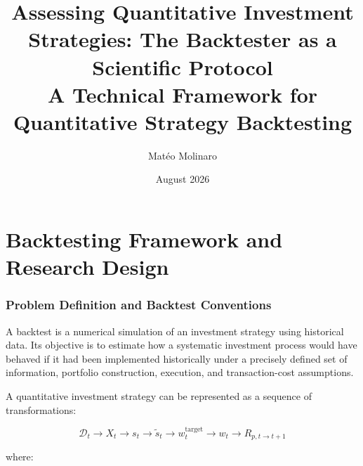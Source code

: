 \documentclass[11pt,a4paper]{article}
\title{\textbf{Assessing Quantitative Investment Strategies: The Backtester as a Scientific Protocol}\\
\large A Technical Framework for Quantitative Strategy Backtesting}
\author{Matéo Molinaro}
\date{August 2026}
\begin{document}
\maketitle

\tableofcontents

\newpage


\part{Backtesting Framework and Research Design}


\section{Problem Definition and Backtest Conventions}
\label{sec:problem_definition}

A backtest is a numerical simulation of an investment strategy using historical
data. Its objective is to estimate how a systematic investment process would
have behaved if it had been implemented historically under a precisely defined
set of information, portfolio construction, execution, and transaction-cost
assumptions.

A quantitative investment strategy can be represented as a sequence of
transformations:

\begin{equation}
\boxed{
\mathcal{D}_t
\longrightarrow
X_t
\longrightarrow
s_t
\longrightarrow
\widetilde{s}_t
\longrightarrow
w_t^{\mathrm{target}}
\longrightarrow
w_t
\longrightarrow
R_{p,t\rightarrow t+1}
}
\end{equation}

where:
\end{document}
